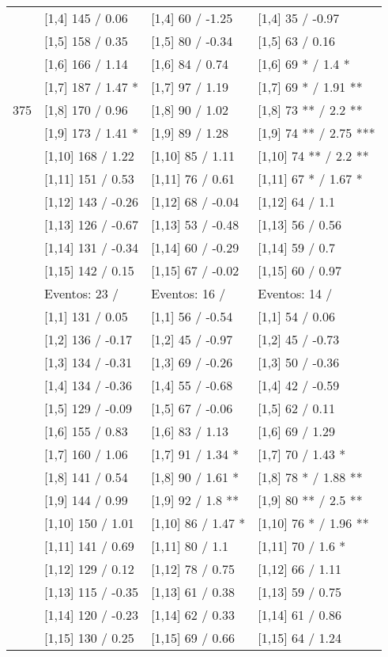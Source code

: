 \begin{table}
\begin{tabular}[t]{llll}
\addlinespace
 & {}[1,4] 145  / 0.06 & {}[1,4] 60  / -1.25 & {}[1,4] 35  / -0.97\\
 & {}[1,5] 158  / 0.35 & {}[1,5] 80  / -0.34 & {}[1,5] 63  / 0.16\\
 & {}[1,6] 166  / 1.14 & {}[1,6] 84  / 0.74 & {}[1,6] 69 * / 1.4 *\\
 & {}[1,7] 187  / 1.47 * & {}[1,7] 97  / 1.19 & {}[1,7] 69 * / 1.91 **\\
375 & {}[1,8] 170  / 0.96 & {}[1,8] 90  / 1.02 & {}[1,8] 73 ** / 2.2 **\\
\addlinespace
 & {}[1,9] 173  / 1.41 * & {}[1,9] 89  / 1.28 & {}[1,9] 74 ** / 2.75 ***\\
 & {}[1,10] 168  / 1.22 & {}[1,10] 85  / 1.11 & {}[1,10] 74 ** / 2.2 **\\
 & {}[1,11] 151  / 0.53 & {}[1,11] 76  / 0.61 & {}[1,11] 67 * / 1.67 *\\
 & {}[1,12] 143  / -0.26 & {}[1,12] 68  / -0.04 & {}[1,12] 64  / 1.1\\
 & {}[1,13] 126  / -0.67 & {}[1,13] 53  / -0.48 & {}[1,13] 56  / 0.56\\
\addlinespace
 & {}[1,14] 131  / -0.34 & {}[1,14] 60  / -0.29 & {}[1,14] 59  / 0.7\\
 & {}[1,15] 142  / 0.15 & {}[1,15] 67  / -0.02 & {}[1,15] 60  / 0.97\\
 & Eventos:  23 / & Eventos:  16 / & Eventos:  14 /\\
 & {}[1,1] 131  / 0.05 & {}[1,1] 56  / -0.54 & {}[1,1] 54  / 0.06\\
 & {}[1,2] 136  / -0.17 & {}[1,2] 45  / -0.97 & {}[1,2] 45  / -0.73\\
\addlinespace
 & {}[1,3] 134  / -0.31 & {}[1,3] 69  / -0.26 & {}[1,3] 50  / -0.36\\
 & {}[1,4] 134  / -0.36 & {}[1,4] 55  / -0.68 & {}[1,4] 42  / -0.59\\
 & {}[1,5] 129  / -0.09 & {}[1,5] 67  / -0.06 & {}[1,5] 62  / 0.11\\
 & {}[1,6] 155  / 0.83 & {}[1,6] 83  / 1.13 & {}[1,6] 69  / 1.29\\
 & {}[1,7] 160  / 1.06 & {}[1,7] 91  / 1.34 * & {}[1,7] 70  / 1.43 *\\
\addlinespace
500 & {}[1,8] 141  / 0.54 & {}[1,8] 90  / 1.61 * & {}[1,8] 78 * / 1.88 **\\
 & {}[1,9] 144  / 0.99 & {}[1,9] 92  / 1.8 ** & {}[1,9] 80 ** / 2.5 **\\
 & {}[1,10] 150  / 1.01 & {}[1,10] 86  / 1.47 * & {}[1,10] 76 * / 1.96 **\\
 & {}[1,11] 141  / 0.69 & {}[1,11] 80  / 1.1 & {}[1,11] 70  / 1.6 *\\
 & {}[1,12] 129  / 0.12 & {}[1,12] 78  / 0.75 & {}[1,12] 66  / 1.11\\
\addlinespace
 & {}[1,13] 115  / -0.35 & {}[1,13] 61  / 0.38 & {}[1,13] 59  / 0.75\\
 & {}[1,14] 120  / -0.23 & {}[1,14] 62  / 0.33 & {}[1,14] 61  / 0.86\\
 & {}[1,15] 130  / 0.25 & {}[1,15] 69  / 0.66 & {}[1,15] 64  / 1.24\\
\bottomrule
\end{tabular}
\end{table}
